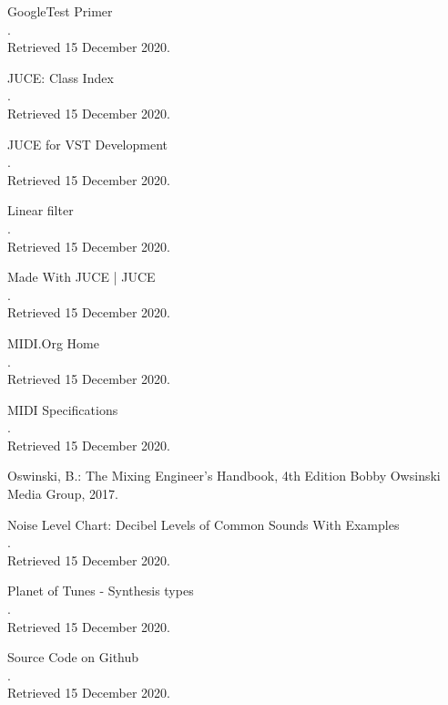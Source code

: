 \documentclass[a4paper,12pt]{report}
\begin{document}
\begin{thebibliography}{9}
GoogleTest Primer\\
.\\
Retrieved 15 December 2020.

JUCE: Class Index\\
.\\
Retrieved 15 December 2020.

JUCE for VST Development\\
.\\
Retrieved 15 December 2020.

Linear filter\\
.\\
Retrieved 15 December 2020.

Made With JUCE | JUCE\\
.\\
Retrieved 15 December 2020.

MIDI.Org Home\\
.\\
Retrieved 15 December 2020.

MIDI Specifications\\
.\\
Retrieved 15 December 2020.

Oswinski, B.: The Mixing Engineer's Handbook, 4th Edition
Bobby Owsinski Media Group, 2017.

Noise Level Chart: Decibel Levels of Common Sounds With Examples\\
.\\
Retrieved 15 December 2020.

Planet of Tunes - Synthesis types\\
.\\
Retrieved 15 December 2020.

Source Code on Github\\
.\\
Retrieved 15 December 2020.


\end{thebibliography}
\end{document}
